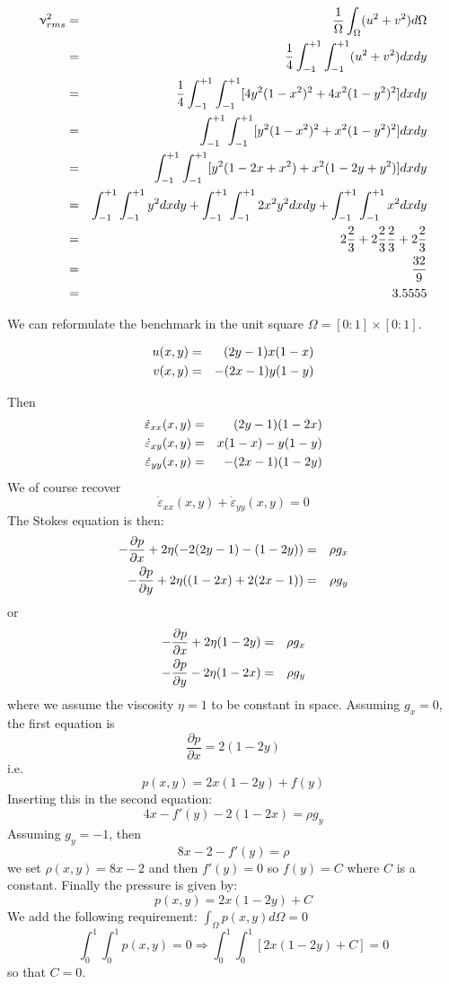 \begin{eqnarray}
\upnu_{rms}^2 
&=& \frac{1}{\Omega} \int_\Omega (u^2+v^2) d\Omega \nonumber\\
&=& \frac{1}{4} \int_{-1}^{+1}\int_{-1}^{+1} (u^2+v^2) dxdy \nonumber\\
&=& \frac{1}{4} \int_{-1}^{+1}\int_{-1}^{+1} [ 4y^2(1-x^2)^2 + 4x^2(1-y^2)^2   ] dxdy \nonumber\\
&=& \int_{-1}^{+1}\int_{-1}^{+1} [ y^2(1-x^2)^2 + x^2(1-y^2)^2   ] dxdy \nonumber\\
&=& \int_{-1}^{+1}\int_{-1}^{+1} [ y^2(1-2x+x^2) + x^2(1-2y+y^2)  ] dxdy \nonumber\\
&=& \int_{-1}^{+1}\int_{-1}^{+1} y^2 dxdy
+ \int_{-1}^{+1}\int_{-1}^{+1} 2 x^2 y^2 dxdy
+ \int_{-1}^{+1}\int_{-1}^{+1} x^2 dxdy\nonumber\\
&=& 2  \frac23 + 2 \frac23\frac23 + 2 \frac23 \nonumber\\
&=& \frac{32}{9} \nonumber\\
&=& 3.5555
\end{eqnarray}

We can reformulate the benchmark in the unit square $\Omega=[0:1]\times[0:1]$.

\begin{eqnarray}
u(x,y) &=&  (2y-1)x(1-x) \nonumber\\
v(x,y) &=& - (2x-1)y(1-y) \nonumber
\end{eqnarray}

Then 
\begin{eqnarray}
\dot\varepsilon_{xx}(x,y) &=& (2y-1)(1-2x) \nonumber\\
\dot\varepsilon_{xy}(x,y) &=&  x(1-x)  - y(1-y)  \nonumber\\
\dot\varepsilon_{yy}(x,y) &=& - (2x-1)(1-2y)  \nonumber
\end{eqnarray}
We of course recover 
\[
\dot\varepsilon_{xx}(x,y) + \dot\varepsilon_{yy}(x,y) = 0
\]
The Stokes equation is then:
\begin{eqnarray}
-\frac{\partial p}{\partial x} + 2\eta (-2(2y-1)-(1-2y)  ) &=& \rho g_x \nonumber\\
-\frac{\partial p}{\partial y} + 2\eta ((1-2x)+2(2x-1)  ) &=& \rho g_y \nonumber
\end{eqnarray}
or
\begin{eqnarray}
-\frac{\partial p}{\partial x} + 2\eta (1-2y) &=& \rho g_x \nonumber\\
-\frac{\partial p}{\partial y} - 2\eta (1-2x) &=& \rho g_y \nonumber
\end{eqnarray}
where we assume the viscosity $\eta=1$ to be constant in space.
Assuming $g_x=0$, the first equation is
\[
\frac{\partial p}{\partial x} =  2 (1-2y)
\]
i.e.
\[
p(x,y) = 2 x (1-2y) + f(y)
\]
Inserting this in the second equation:
\[
4 x - f'(y) - 2 (1-2x)   = \rho g_y
\]
Assuming $g_y=-1$, then
\[
8 x -2  - f'(y)  = \rho 
\]
we set $\rho(x,y)= 8x-2$ and then $f'(y)=0$ so $f(y)=C$ where $C$
is a constant.
Finally the pressure is given by:
\[
p(x,y)= 2 x (1-2y) + C
\]
We add the following requirement: $\int_\Omega p(x,y) d\Omega =0$ 
\[
\int_{0}^1 \int _0^1 p(x,y) = 0
\Rightarrow 
\int_{0}^1 \int _0^1 [ 2 x (1-2y) + C] = 0
\]
so that $C=0$.

